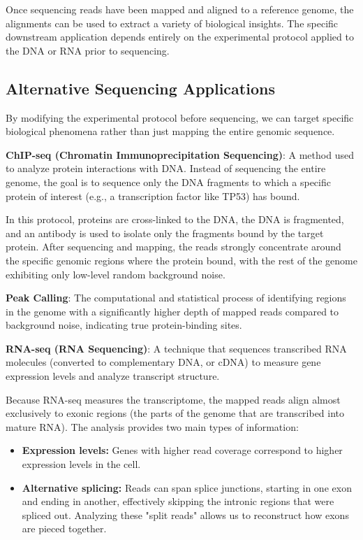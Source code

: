 Once sequencing reads have been mapped and aligned to a reference genome, the alignments can be used to extract a variety of biological insights. The specific downstream application depends entirely on the experimental protocol applied to the DNA or RNA prior to sequencing.

\subsection{Alternative Sequencing Applications}

By modifying the experimental protocol before sequencing, we can target specific biological phenomena rather than just mapping the entire genomic sequence.

\begin{important}
  \textbf{ChIP-seq (Chromatin Immunoprecipitation Sequencing)}: A method used to analyze protein interactions with DNA. Instead of sequencing the entire genome, the goal is to sequence only the DNA fragments to which a specific protein of interest (e.g., a transcription factor like TP53) has bound.
\end{important}

In this protocol, proteins are cross-linked to the DNA, the DNA is fragmented, and an antibody is used to isolate only the fragments bound by the target protein. After sequencing and mapping, the reads strongly concentrate around the specific genomic regions where the protein bound, with the rest of the genome exhibiting only low-level random background noise. 

\begin{important}
  \textbf{Peak Calling}: The computational and statistical process of identifying regions in the genome with a significantly higher depth of mapped reads compared to background noise, indicating true protein-binding sites.
\end{important}

\begin{important}
  \textbf{RNA-seq (RNA Sequencing)}: A technique that sequences transcribed RNA molecules (converted to complementary DNA, or cDNA) to measure gene expression levels and analyze transcript structure.
\end{important}

Because RNA-seq measures the transcriptome, the mapped reads align almost exclusively to exonic regions (the parts of the genome that are transcribed into mature RNA). The analysis provides two main types of information:
\begin{itemize}
    \item \textbf{Expression levels:} Genes with higher read coverage correspond to higher expression levels in the cell.
    \item \textbf{Alternative splicing:} Reads can span splice junctions, starting in one exon and ending in another, effectively skipping the intronic regions that were spliced out. Analyzing these "split reads" allows us to reconstruct how exons are pieced together.
\end{itemize}

